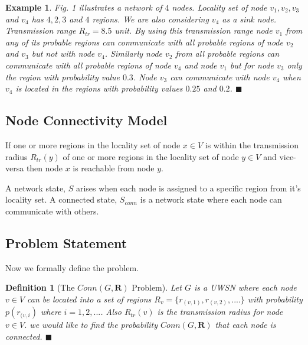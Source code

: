 \documentclass[11pt]{article}
\newtheorem*{defi}{Definition}
\newtheorem{exmp}{Example}[section]
\begin{document}
\begin{exmp}
\normalfont
Fig. 1 illustrates a network of $4$ nodes. Locality set of node $v_1,v_2,v_3$ and $v_4$ has $4,2,3$ and $4$ regions. We are also considering $v_4$ as a sink node. Transmission range \(R_{tr}=8.5\) unit. By using this transmission range node $v_1$ from any of its probable regions can communicate with all probable regions of node $v_2$ and $v_3$ but not with node $v_4$. Similarly node $v_2$ from all probable regions can communicate with all probable regions of node $v_4$ and node $v_1$ but for node $v_3$ only the region with probability value $0.3$. Node $v_3$ can communicate with node $v_4$ when $v_4$ is located in the regions with probability values $0.25$ and $0.2$. $\blacksquare$

\end{exmp}
 \subsection{Node Connectivity Model}
If one or more regions in the locality set of node $x\in V$ is within the transmission radius $R_{tr}(y)$ of one or more regions in the locality set of node $y\in V$ and vice-versa then node $x$ is reachable from node $y$.


A network state, $S$ arises when each node is assigned to a specific region from it's locality set. A connected state, $S_{conn}$ is a network state where each node can communicate with others.
\subsection{Problem Statement}
Now we formally define the problem.
\begin{defi}[The $Conn(G,\textbf{R})$ Problem]
\normalfont
Let $G$ is a UWSN where each node $v\in V$ can be located into a set of regions  $R_v=\{r_{(v,1)},r_{(v,2)},....\}$  with probability $p(r_{(v,i})$ where $i=1,2,...$. Also $R_{tr}(v)$ is the transmission radius for node $v\in V$. we would like to find the probability $Conn(G,\textbf{R})$ that each node is connected. $\blacksquare$
\end{defi}
\end{document}

